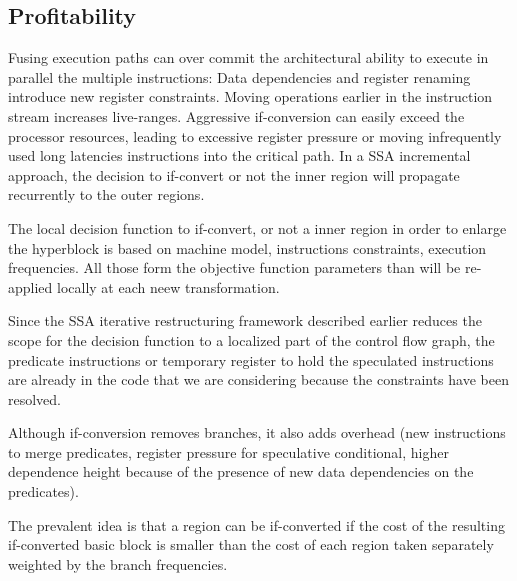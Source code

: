 \subsection{Profitability}

Fusing execution paths can over commit the architectural ability to execute in parallel the multiple instructions: Data dependencies and register renaming introduce new register constraints. Moving operations earlier in the instruction stream increases live-ranges. 
Aggressive if-conversion can easily exceed the processor resources, leading to excessive register pressure or moving infrequently used long latencies instructions into the critical path. In a SSA incremental approach, the decision to if-convert or not the inner region will propagate recurrently to the outer regions.

The local decision function to if-convert, or not a inner region in order to enlarge the hyperblock is based on machine model, instructions constraints, execution frequencies. All those form the objective function parameters than will be re-applied locally at each neew transformation.

Since the SSA iterative restructuring framework described earlier reduces the scope for the decision function to a localized part of the control flow graph, the predicate instructions or temporary register to hold the speculated instructions are already in the code that we are considering because the constraints have been resolved. 

Although if-conversion removes branches, it also adds overhead (new instructions to merge predicates, register pressure for speculative conditional, higher dependence height because of the presence of new data dependencies on the predicates).

The prevalent idea is that a region can be if-converted if the cost of the resulting if-converted basic block is smaller than the cost of each region taken separately weighted by the branch frequencies.

